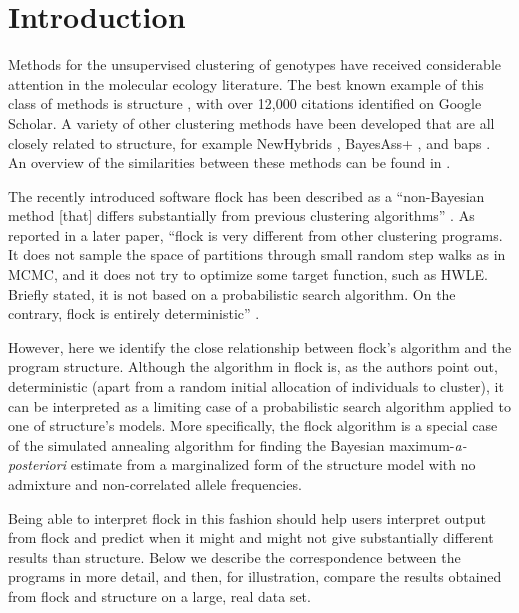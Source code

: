 
\section*{Introduction}
Methods for the unsupervised clustering of genotypes have received 
considerable attention in the molecular ecology literature.  
The best known example of this class of methods is {\sc structure} 
\citep{Pritchardetal2000}, with over 12,000 citations identified on 
Google Scholar.  A variety of other 
clustering methods have been developed that are all closely related to 
{\sc structure}, for example {\sc NewHybrids} \citep{And&Tho2002}, {\sc 
BayesAss+} \citep{Wil&Ran2003}, and {\sc baps} 
\citep{Coranderetal2004}. An overview of the similarities between these methods can be 
found in \citet{Anderson2009PGAC}.

The recently introduced software {\sc flock} \citep{Duc&Tur2009} has
been described
as a ``non-Bayesian method [that] 
differs substantially from previous 
clustering algorithms'' \citep[][p.~1333]{Duc&Tur2009}. As reported
in a later paper, ``{\sc flock} is very different from  other clustering 
programs. It does not sample the space of partitions through small 
random step walks as in MCMC, and it does not try to optimize some 
target function, such as HWLE\@. Briefly stated, it is not based on a 
probabilistic search algorithm. On the contrary, {\sc flock} is 
entirely deterministic'' \citep[][p.~736]{Duc&Tur2012}.

However, here we identify 
the close relationship between {\sc flock}'s algorithm and the program
{\sc structure}.  Although the algorithm in {\sc flock}
is, as the authors point out, deterministic (apart from a random initial allocation of 
individuals to cluster), it can be interpreted as a 
limiting case of a probabilistic search algorithm applied to one of {\sc structure}'s
models.  More specifically, the {\sc flock} 
algorithm is a special case of the simulated annealing
algorithm for finding the Bayesian maximum-{\em a-posteriori}
estimate from a marginalized form of the {\sc structure} model with no
admixture and non-correlated allele frequencies.  

Being able to interpret {\sc flock} in this fashion should help users
interpret output from {\sc flock} and predict when it might and might not
give substantially different results than {\sc structure}. Below we describe
the correspondence between the programs in more detail, and then, for illustration, compare
the results obtained from {\sc flock} and {\sc structure} on a large, real data
set.

